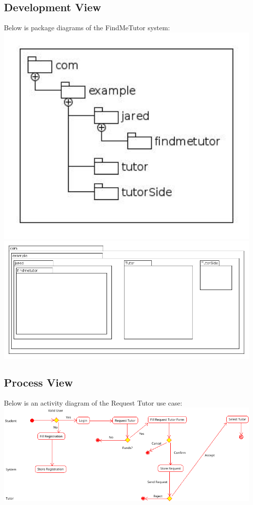 \documentclass[12pt]{article}
\begin{document}
\subsection{Development View}
Below is package diagrams of the FindMeTutor system:\\
\includegraphics[width=140mm]{./Pakage.jpg}
\includegraphics[width=140mm]{./Pakage2.jpg}
\subsection{Process View}
Below is an activity diagram of the Request Tutor use case:\\
\includegraphics[width=140mm]{./activitydiagram.png}
\end{document}
